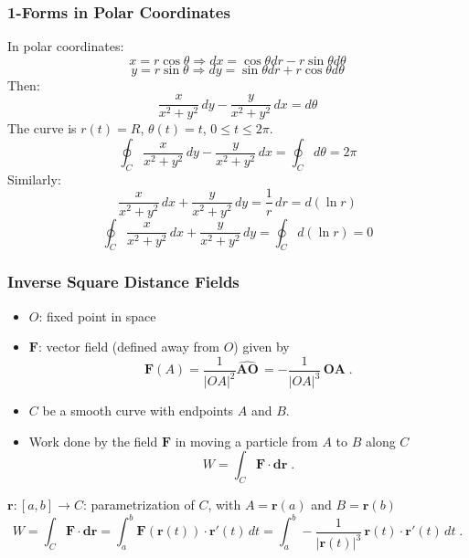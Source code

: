 \begin{frame}
  \frametitle{1-Forms in Polar Coordinates}

  In polar coordinates:
  $$x = r\cos{\theta} \Longrightarrow dx = \cos{\theta} dr - r\sin{\theta} d\theta$$
  $$y = r\sin{\theta} \Longrightarrow dy = \sin{\theta} dr + r\cos{\theta} d\theta$$
  \pause Then:
  $$ \frac{x}{x^2+y^2} \, dy - \frac{y}{x^2+y^2}\, dx = d\theta$$
  \pause The curve is $r(t) = R$, $\theta(t) = t$, $0 \leqslant t \leqslant 2\pi$.
  $$\oint_C \frac{x}{x^2+y^2} \, dy - \frac{y}{x^2+y^2}\, dx = \oint_C d\theta = 2\pi$$
  \pause Similarly:
  $$\frac{x}{x^2+y^2} \, dx + \frac{y}{x^2+y^2}\, dy =
  \frac{1}{r} \, dr =  d(\ln{r}) $$
  $$\oint_C \frac{x}{x^2+y^2} \, dx + \frac{y}{x^2+y^2}\, dy = \oint_C d(\ln{r}) = 0$$
\end{frame}


\begin{frame}
  \frametitle{Inverse Square Distance Fields}

  \begin{itemize}
    \item $O$: fixed point in space
    \item $\textbf{F}$: vector field (defined away from $O$) given by
%
$$\textbf{F}(A) = \frac{1}{|OA|^2} \widehat{\textbf{AO}}\,  = -\frac{1}{|OA|^3} \, \textbf{OA}\; .$$
    \item $C$ be a smooth curve with endpoints $A$ and $B$.
    \item Work done by the field $\textbf{F}$ in moving a particle from $A$ to $B$ along $C$
%
$$W = \int_C \textbf{F} \cdot \textbf{dr}\; .$$
  \end{itemize}

\pause  $\textbf{r} \colon [a,b] \to C$: parametrization of $C$, with $A=\textbf{r}(a)$ and $B=\textbf{r}(b)$
$$
  W  = \int_C \textbf{F} \cdot \textbf{dr} = \int_a^b \textbf{F}(\textbf{r}(t)) \cdot \textbf{r}'(t) \, dt = \int_a^b - \frac{1}{|\textbf{r}(t)|^3} \, \textbf{r}(t) \cdot \textbf{r}'(t) \, dt \; .
$$
\end{frame}


